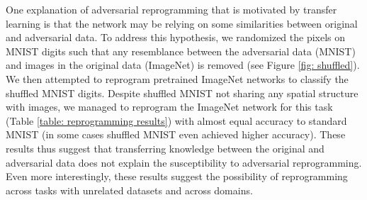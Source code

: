 \documentclass{article}
\begin{document}
One explanation of adversarial reprogramming that is motivated by transfer learning  \citep{yosinski2014transferable} is that the network may be relying on some similarities between original and adversarial data. To address this hypothesis, we randomized the pixels on MNIST digits such that any resemblance between the adversarial data (MNIST) and images in the original data (ImageNet) is removed (see Figure \ref{fig: shuffled}). We then attempted to reprogram pretrained ImageNet networks to classify the shuffled MNIST digits. Despite shuffled MNIST not sharing any spatial structure with images, we managed to reprogram the ImageNet network for this task (Table \ref{table: reprogramming results}) with almost equal accuracy to standard MNIST (in some cases shuffled MNIST even achieved higher accuracy). These results thus suggest that transferring knowledge between the original and adversarial data does not explain the susceptibility to adversarial reprogramming. Even more interestingly, these results suggest the possibility of reprogramming across tasks with unrelated datasets and across domains.
\end{document}
